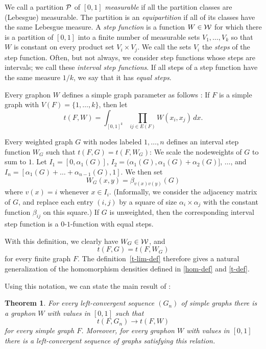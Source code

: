 \documentclass[12pt]{article}
\newtheorem{theorem}{Theorem}[section]
\numberwithin{equation}{section}
\def\PP{{\cal P}}\def\QQ{{\cal Q}}\def\RR{{\cal R}}
\begin{document}
We call a partition $\PP$ of $[0,1]$ {\it measurable} if all the
partition classes are (Lebesgue) measurable. The partition is an {\it
equipartition} if all of its classes have the same Lebesgue measure.
A {\it step function} is
a function $W\in{\cal W}$ for which there is a
partition of $[0,1]$ into a finite number of measurable sets
$V_1,\dots,V_k$ so that $W$ is constant on every product set
$V_i\times V_j$. We call the sets $V_i$ the {\it steps} of the step
function. Often, but not always, we consider step functions whose
steps are intervals; we call these {\it interval step functions}. If
all steps of a step function have the same measure $1/k$, we say that
it has {\it equal steps}.

Every graphon $W$ defines a simple graph parameter as follows
\cite{LSz1}: If $F$ is a simple graph with $V(F)=\{1,\dots,k\}$,
then let
\begin{equation}
\label{t-lim-def} t(F,W)=\int_{[0,1]^k} \prod_{ij\in E(F)}
W(x_i,x_j)\,dx.
\end{equation}

Every weighted graph $G$ with nodes labeled $1,\dots,n$ defines an
interval step function $W_G$ such that $t(F,G)= t(F,W_G)$: We
scale the nodeweights of $G$ to sum to $1$. Let
$I_1=[0,\alpha_1(G)]$, $I_2=(\alpha_1(G),\alpha_1(G)+\alpha_2(G)]$,
$\dots$, and $I_n=[\alpha_1(G)+\dots+\alpha_{n-1}(G),1]$.  We then
set
\[
W_G(x,y)=\beta_{v(x)v(y)}(G)
\]
where $v(x)=i$ whenever $x\in I_i$. (Informally, we consider the
adjacency matrix of $G$, and replace each entry $(i,j)$ by a square
of size $\alpha_i\times\alpha_j$ with the constant function
$\beta_{ij}$ on this square.) If $G$ is unweighted, then the
corresponding interval step function is a $0$-$1$-function with
equal steps.

With this definition, we clearly have $W_G\in{\cal W}$, and
\begin{equation}
\label{tG=tWG}
t(F,G)= t(F,W_G)
\end{equation}
for every finite graph $F$. The definition~\eqref{t-lim-def}
therefore gives a natural generalization of the homomorphism
densities defined in \eqref{hom-def} and \eqref{t-def}.

Using this notation, we can state the main result of
\cite{LSz1}:

\begin{theorem}\label{LSZTHM}
For every left-convergent sequence $(G_n)$ of simple graphs
there is a graphon $W$ with values in $[0,1]$ such that
\[
t(F,G_n)\to t(F,W)
\]
for every simple graph $F$. Moreover, for every graphon
$W$ with values in $[0,1]$ there is a left-convergent sequence of
graphs satisfying this relation.
\end{theorem}
\end{document}
